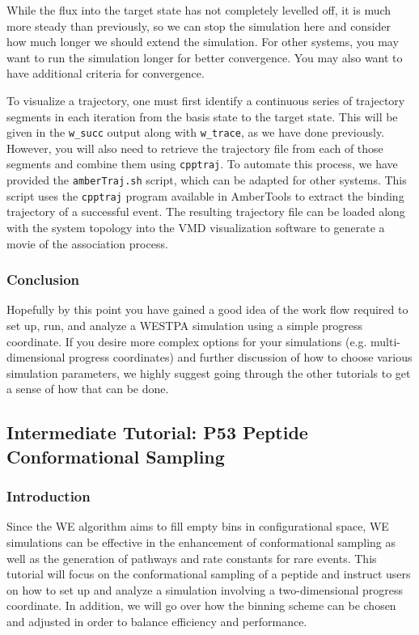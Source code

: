 While the flux into the target state has not completely levelled off, it is much more steady than previously, so we can stop the simulation here and consider how much longer we should extend the simulation. 
For other systems, you may want to run the simulation longer for better convergence. 
You may also want to have additional criteria for convergence.

To visualize a trajectory, one must first identify a continuous series of trajectory segments in each iteration from the basis state to the target state. 
This will be given in the \verb|w_succ| output along with \verb|w_trace|, as we have done previously. 
However, you will also need to retrieve the trajectory file from each of those segments and combine them using \verb|cpptraj|. 
To automate this process, we have provided the \verb|amberTraj.sh| script, which can be adapted for other systems. 
This script uses the \verb|cpptraj| program available in AmberTools to extract the binding trajectory of a successful event.
The resulting trajectory file can be loaded along with the system topology into the VMD visualization software to generate a movie of the association process.
 
\subsubsection{Conclusion}

Hopefully by this point you have gained a good idea of the work flow required to set up, run, and analyze a WESTPA simulation using a simple progress coordinate. 
If you desire more complex options for your simulations (e.g. multi-dimensional progress coordinates) and further discussion of how to choose various simulation parameters, we highly suggest going through the other tutorials to get a sense of how that can be done.

\subsection{Intermediate Tutorial: P53 Peptide Conformational Sampling}
\label{tut:p53-int}

\subsubsection{Introduction}

Since the WE algorithm aims to fill empty bins in configurational space, WE simulations can be effective in the enhancement of conformational sampling \citep{Zwier2015} as well as the generation of pathways and rate constants for rare events. 
This tutorial will focus on the conformational sampling of a peptide and instruct users on how to set up and analyze a simulation involving a two-dimensional progress coordinate. 
In addition, we will go over how the binning scheme can be chosen and adjusted in order to balance efficiency and performance.

